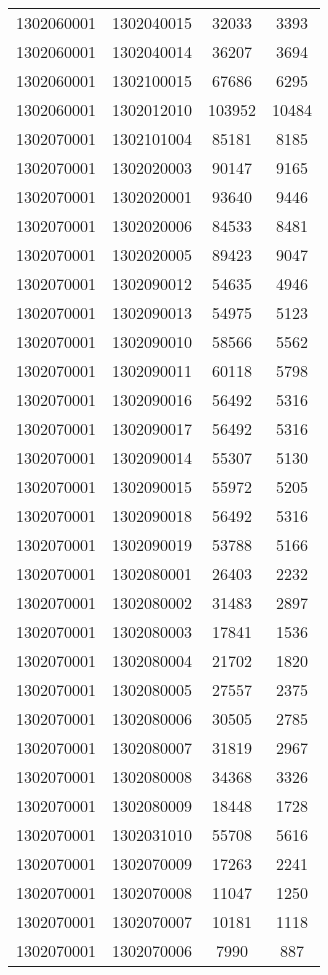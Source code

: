 \begin{longtable}{llcc}
1302060001 & 1302040015 & 32033 & 3393\\
1302060001 & 1302040014 & 36207 & 3694\\
1302060001 & 1302100015 & 67686 & 6295\\
1302060001 & 1302012010 & 103952 & 10484\\
1302070001 & 1302101004 & 85181 & 8185\\
1302070001 & 1302020003 & 90147 & 9165\\
1302070001 & 1302020001 & 93640 & 9446\\
1302070001 & 1302020006 & 84533 & 8481\\
1302070001 & 1302020005 & 89423 & 9047\\
1302070001 & 1302090012 & 54635 & 4946\\
1302070001 & 1302090013 & 54975 & 5123\\
1302070001 & 1302090010 & 58566 & 5562\\
1302070001 & 1302090011 & 60118 & 5798\\
1302070001 & 1302090016 & 56492 & 5316\\
1302070001 & 1302090017 & 56492 & 5316\\
1302070001 & 1302090014 & 55307 & 5130\\
1302070001 & 1302090015 & 55972 & 5205\\
1302070001 & 1302090018 & 56492 & 5316\\
1302070001 & 1302090019 & 53788 & 5166\\
1302070001 & 1302080001 & 26403 & 2232\\
1302070001 & 1302080002 & 31483 & 2897\\
1302070001 & 1302080003 & 17841 & 1536\\
1302070001 & 1302080004 & 21702 & 1820\\
1302070001 & 1302080005 & 27557 & 2375\\
1302070001 & 1302080006 & 30505 & 2785\\
1302070001 & 1302080007 & 31819 & 2967\\
1302070001 & 1302080008 & 34368 & 3326\\
1302070001 & 1302080009 & 18448 & 1728\\
1302070001 & 1302031010 & 55708 & 5616\\
1302070001 & 1302070009 & 17263 & 2241\\
1302070001 & 1302070008 & 11047 & 1250\\
1302070001 & 1302070007 & 10181 & 1118\\
1302070001 & 1302070006 & 7990 & 887\\

\end{longtable}
